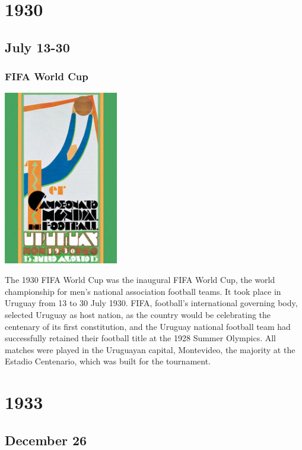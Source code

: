 \documentclass[11pt]{report}
\begin{document}
\chapter{1930}
\section{July 13-30}
\subsection{FIFA World Cup}
\vspace{2mm}\begin{center}\includegraphics[width=5cm]{./img/fifa1930.jpg}\end{center}
The 1930 FIFA World Cup was the inaugural FIFA World Cup, the world championship for men's national association football teams. It took place in Uruguay from 13 to 30 July 1930. FIFA, football's international governing body, selected Uruguay as host nation, as the country would be celebrating the centenary of its first constitution, and the Uruguay national football team had successfully retained their football title at the 1928 Summer Olympics. All matches were played in the Uruguayan capital, Montevideo, the majority at the Estadio Centenario, which was built for the tournament.

\chapter{1933}
\section{December 26}
\end{document}
